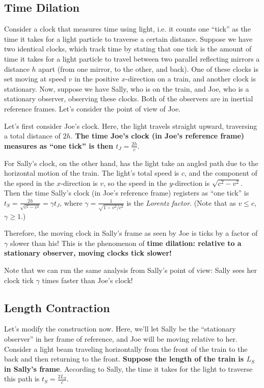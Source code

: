 \documentclass[12pt]{scrartcl}
\begin{document}
\subsection*{Time Dilation}
Consider a clock that measures time using light, i.e. it counts one ``tick'' as the time it takes for a light particle to traverse a certain distance. Suppose we have two identical clocks, which track time by stating that one tick is the amount of time it takes for a light particle to travel between two parallel reflecting mirrors a distance $h$ apart (from one mirror, to the other, and back). One of these clocks is set moving at speed $v$ in the positive $x$-direction on a train, and another clock is stationary. Now, suppose we have Sally, who is on the train, and Joe, who is a stationary observer, observing these clocks. Both of the observers are in inertial reference frames. Let's consider the point of view of Joe.

Let's first consider Joe's clock. Here, the light travels straight upward, traversing a total distance of $2h$. \textbf{The time Joe's clock (in Joe's reference frame) measures as ``one tick'' is then $t_J = \frac{2h}{c}$}.

For Sally's clock, on the other hand, has the light take an angled path due to the horizontal motion of the train. The light's total speed is $c$, and the component of the speed in the $x$-direction is $v$, so the speed in the $y$-direction is $\sqrt{c^2-v^2}$. Then the time Sally's clock (in Joe's reference frame) registers as ``one tick'' is $t_S = \frac{2h}{\sqrt{c^2-v^2}} = \gamma t_J$, where $\gamma = \frac{1}{\sqrt{1-v^2/c^2}}$ is the \textit{Lorentz factor}. (Note that as $v \leq c$, $\gamma \geq 1$.)

Therefore, the moving clock in Sally's frame as seen by Joe is ticks by a factor of $\gamma$ slower than his! This is the phenomenon of \textbf{time dilation: relative to a stationary observer, moving clocks tick slower!}

Note that we can run the same analysis from Sally's point of view: Sally sees her clock tick $\gamma$ times faster than Joe's clock!

\subsection*{Length Contraction}
Let's modify the construction now. Here, we'll let Sally be the ``stationary observer'' in her frame of reference, and Joe will be moving relative to her. Consider a light beam traveling horizontally from the front of the train to the back and then returning to the front. \textbf{Suppose the length of the train is $L_S$ in Sally's frame}. According to Sally, the time it takes for the light to traverse this path is $t_S = \frac{2 L_S}{c}$.
\end{document}
